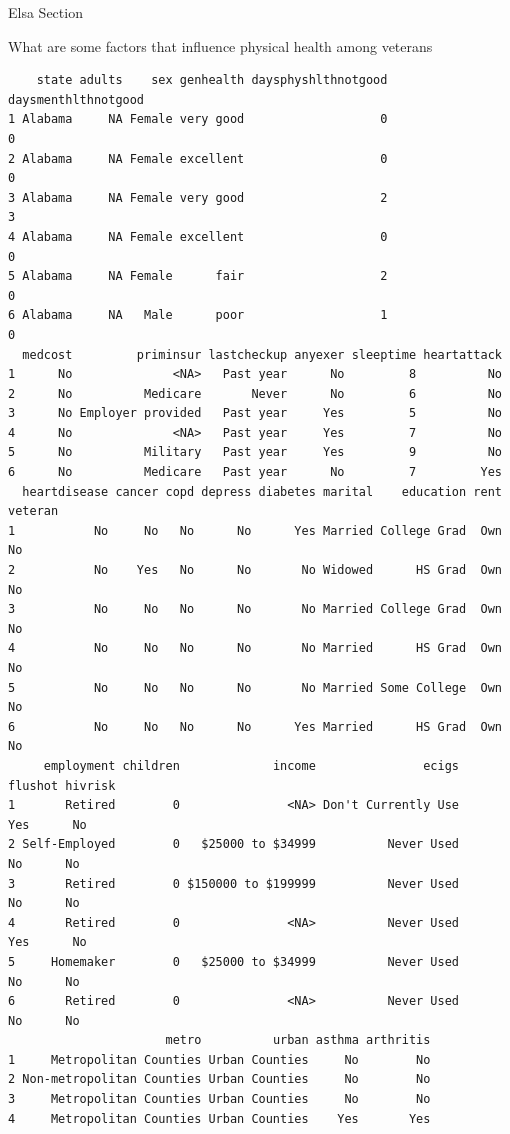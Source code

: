 \documentclass[
  10pt,
  letterpaper,
  DIV=11,
  numbers=noendperiod]{scrartcl}
\begin{document}
Elsa Section

What are some factors that influence physical health among veterans

\begin{verbatim}
    state adults    sex genhealth daysphyshlthnotgood daysmenthlthnotgood
1 Alabama     NA Female very good                   0                   0
2 Alabama     NA Female excellent                   0                   0
3 Alabama     NA Female very good                   2                   3
4 Alabama     NA Female excellent                   0                   0
5 Alabama     NA Female      fair                   2                   0
6 Alabama     NA   Male      poor                   1                   0
  medcost         priminsur lastcheckup anyexer sleeptime heartattack
1      No              <NA>   Past year      No         8          No
2      No          Medicare       Never      No         6          No
3      No Employer provided   Past year     Yes         5          No
4      No              <NA>   Past year     Yes         7          No
5      No          Military   Past year     Yes         9          No
6      No          Medicare   Past year      No         7         Yes
  heartdisease cancer copd depress diabetes marital    education rent veteran
1           No     No   No      No      Yes Married College Grad  Own      No
2           No    Yes   No      No       No Widowed      HS Grad  Own      No
3           No     No   No      No       No Married College Grad  Own      No
4           No     No   No      No       No Married      HS Grad  Own      No
5           No     No   No      No       No Married Some College  Own      No
6           No     No   No      No      Yes Married      HS Grad  Own      No
     employment children             income               ecigs flushot hivrisk
1       Retired        0               <NA> Don't Currently Use     Yes      No
2 Self-Employed        0   $25000 to $34999          Never Used      No      No
3       Retired        0 $150000 to $199999          Never Used      No      No
4       Retired        0               <NA>          Never Used     Yes      No
5     Homemaker        0   $25000 to $34999          Never Used      No      No
6       Retired        0               <NA>          Never Used      No      No
                      metro          urban asthma arthritis
1     Metropolitan Counties Urban Counties     No        No
2 Non-metropolitan Counties Urban Counties     No        No
3     Metropolitan Counties Urban Counties     No        No
4     Metropolitan Counties Urban Counties    Yes       Yes

\end{verbatim}
\end{document}

